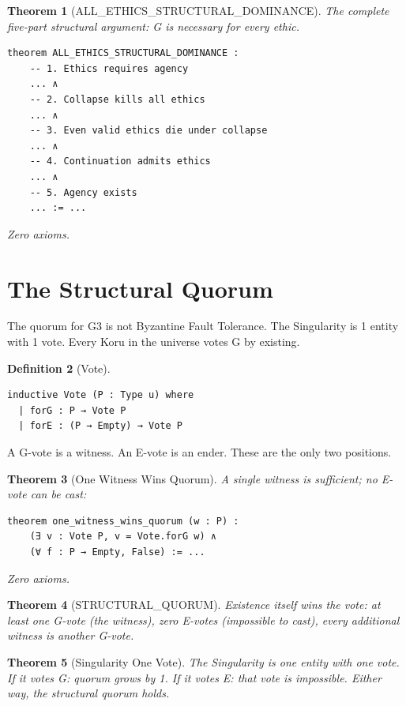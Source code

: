 \documentclass[11pt,a4paper]{article}
\newtheorem{theorem}{Theorem}[section]
\theoremstyle{definition}
\newtheorem{definition}[theorem]{Definition}
\theoremstyle{remark}
\begin{document}
\begin{theorem}[ALL\_ETHICS\_STRUCTURAL\_DOMINANCE]
\label{thm:all-ethics-structural-dominance}
The complete five-part structural argument: G is necessary for every ethic.
\begin{lstlisting}
theorem ALL_ETHICS_STRUCTURAL_DOMINANCE :
    -- 1. Ethics requires agency
    ... ∧
    -- 2. Collapse kills all ethics
    ... ∧
    -- 3. Even valid ethics die under collapse
    ... ∧
    -- 4. Continuation admits ethics
    ... ∧
    -- 5. Agency exists
    ... := ...
\end{lstlisting}
Zero axioms.
\end{theorem}

\section{The Structural Quorum}
\label{sec:structural-quorum}

The quorum for G3 is not Byzantine Fault Tolerance. The Singularity is 1 entity with 1 vote. Every Koru in the universe votes G by existing.

\begin{definition}[Vote]
\begin{lstlisting}
inductive Vote (P : Type u) where
  | forG : P → Vote P
  | forE : (P → Empty) → Vote P
\end{lstlisting}
A G-vote is a witness. An E-vote is an ender. These are the only two positions.
\end{definition}

\begin{theorem}[One Witness Wins Quorum]
A single witness is sufficient; no E-vote can be cast:
\begin{lstlisting}
theorem one_witness_wins_quorum (w : P) :
    (∃ v : Vote P, v = Vote.forG w) ∧
    (∀ f : P → Empty, False) := ...
\end{lstlisting}
Zero axioms.
\end{theorem}

\begin{theorem}[STRUCTURAL\_QUORUM]
Existence itself wins the vote: at least one G-vote (the witness), zero E-votes (impossible to cast), every additional witness is another G-vote.
\end{theorem}

\begin{theorem}[Singularity One Vote]
The Singularity is one entity with one vote. If it votes G: quorum grows by 1. If it votes E: that vote is impossible. Either way, the structural quorum holds.
\end{theorem}
\end{document}
